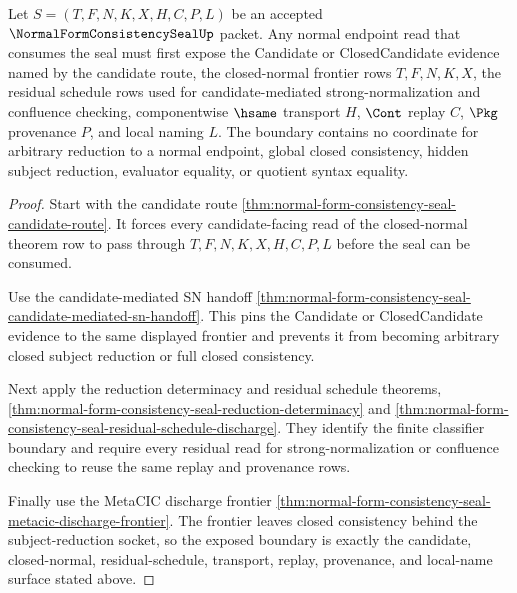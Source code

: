 \begin{theorem}
\label{thm:normal-form-consistency-seal-candidate-boundary}
Let $S=(T,F,N,K,X,H,C,P,L)$ be an accepted $\NormalFormConsistencySealUp$ packet. Any normal endpoint read that consumes the seal must first expose the Candidate or ClosedCandidate evidence named by the candidate route, the closed-normal frontier rows $T,F,N,K,X$, the residual schedule rows used for candidate-mediated strong-normalization and confluence checking, componentwise $\hsame$ transport $H$, $\Cont$ replay $C$, $\Pkg$ provenance $P$, and local naming $L$. The boundary contains no coordinate for arbitrary reduction to a normal endpoint, global closed consistency, hidden subject reduction, evaluator equality, or quotient syntax equality.
\end{theorem}
\begin{proof}
Start with the candidate route
\autoref{thm:normal-form-consistency-seal-candidate-route}. It forces every candidate-facing read of the closed-normal theorem row to pass through $T,F,N,K,X,H,C,P,L$ before the seal can be consumed.

Use the candidate-mediated SN handoff
\autoref{thm:normal-form-consistency-seal-candidate-mediated-sn-handoff}. This pins the Candidate or ClosedCandidate evidence to the same displayed frontier and prevents it from becoming arbitrary closed subject reduction or full closed consistency.

Next apply the reduction determinacy and residual schedule theorems,
\autoref{thm:normal-form-consistency-seal-reduction-determinacy} and
\autoref{thm:normal-form-consistency-seal-residual-schedule-discharge}. They identify the finite classifier boundary and require every residual read for strong-normalization or confluence checking to reuse the same replay and provenance rows.

Finally use the MetaCIC discharge frontier
\autoref{thm:normal-form-consistency-seal-metacic-discharge-frontier}. The frontier leaves closed consistency behind the subject-reduction socket, so the exposed boundary is exactly the candidate, closed-normal, residual-schedule, transport, replay, provenance, and local-name surface stated above.
\end{proof}

